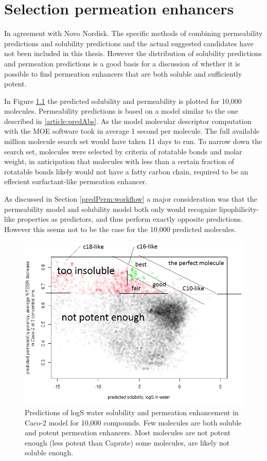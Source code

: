 \chapter{Selection permeation enhancers}

In agreement with Novo Nordisk. The specific methods of combining permeability predictions and solubility predictions and the actual suggested candidates have not been included in this thesis. However the distribution of solubility predictions and permeation predictions is a good basis for a discussion of whether it is possible to find permeation enhancers that are both soluble and sufficiently potent.


In Figure \ref{predictionsCombined} the predicted solubility and permeability is plotted for 10,000 molecules. Permeability predictions is based on a model similar to the one described in \ref{article:predAbs}. As the model molecular descriptor computation with the MOE software took in average 1 second per molecule. The full available million molecule search set would have taken 11 days to run. To narrow down the search set, molecules were selected by criteria of rotatable bonds and molar weight, in anticipation that molecules with less than a certain fraction of rotatable bonds likely would not have a fatty carbon chain, required to be an effecient surfactant-like permeation enhancer.

As discussed in Section \ref{predPerm:workflow} a major consideration was that the permeability model and solubility model both only would recognize lipophilicity-like properties as predictors, and thus perform exactly opposite predictions. However this seems not to be the case for the 10,000 predicted molecules. 

\begin{figure}[!htbp]
\includegraphics[width=\textwidth,height=\textheight,keepaspectratio]{graphics/screened_molecules2.png}
\caption{Predictions of logS water solubility and permeation enhancement in Caco-2 model for 10,000 compounds. Few molecules are both soluble and potent permeation enhancers. Most molecules are not potent enough (less potent than Caprate) some molecules, are likely not soluble enough. }
\label{predictionsCombined}
\end{figure}

